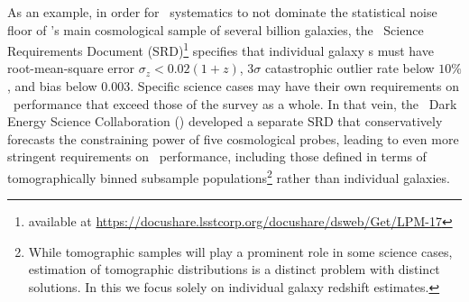 As an example, in order for \pz\ systematics to not dominate the statistical noise floor of \lsst's main cosmological sample of several billion galaxies, the \lsst\ Science Requirements Document (SRD)\footnote{available at \url{https://docushare.lsstcorp.org/docushare/dsweb/Get/LPM-17}} specifies that individual galaxy \pz s must have root-mean-square error $\sigma_z < 0.02 (1+z)$, $3 \sigma$ catastrophic outlier rate below $10\%$, and bias below $0.003$.
Specific science cases may have their own requirements on \pz\ performance that exceed those of the survey as a whole.
In that vein, the \lsst\ Dark Energy Science Collaboration (\desc) developed a separate SRD \citep{the_lsst_dark_energy_science_collaboration_lsst_2018} that conservatively forecasts the constraining power of five cosmological probes, leading to even more stringent requirements on \pz\ performance, including those defined in terms of tomographically binned subsample populations\footnote{While tomographic samples will play a prominent role in some science cases, estimation of tomographic distributions is a distinct problem with distinct solutions.  In this \paper we focus solely on individual galaxy redshift estimates.} rather than individual galaxies.


